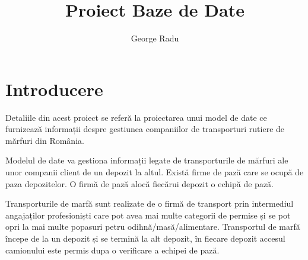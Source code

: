 \documentclass[12pt, a4paper]{article}
\title{Proiect Baze de Date}
\author{George Radu}
\date{}
\begin{document}
\maketitle

\section{Introducere}
\quad \par
Detaliile din acest proiect se referă la proiectarea unui model de date ce furnizează informații despre gestiunea companiilor de transporturi rutiere de mărfuri din România.

Modelul de date va gestiona informații legate de transporturile de mărfuri ale unor companii client de un depozit la altul. Există firme de pază care se ocupă de paza depozitelor. O firmă de pază alocă fiecărui depozit o echipă de pază.

Transporturile de marfă sunt realizate de o firmă de transport prin intermediul angajaților profesioniști care pot avea mai multe categorii de permise și se pot opri la mai multe popasuri petru odihnă/masă/alimentare. Transportul de marfă începe de la un depozit și se termină la alt depozit, în fiecare depozit accesul camionului este permis dupa o verificare a echipei de pază.
\end{document}
